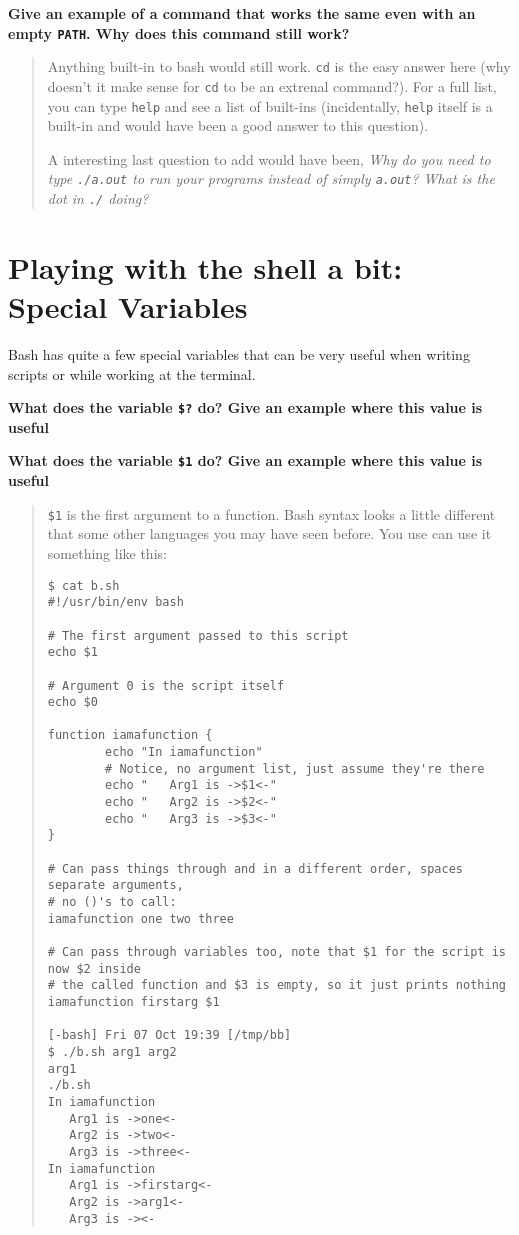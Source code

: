 \documentclass{article}
\begin{document}
\textbf{Give an example of a command that works the same even with an empty
\texttt{PATH}. Why does this command still work?}
\begin{quote}
  \color{violet}
  Anything built-in to bash would still work. \texttt{cd} is the easy answer
  here (why doesn't it make sense for \texttt{cd} to be an extrenal command?).
  For a full list, you can type \texttt{help} and see a list of built-ins
  (incidentally, \texttt{help} itself is a built-in and would have been a
  good answer to this question).

  A interesting last question to add would have been, \emph{Why do you need to
    type \texttt{./a.out} to run your programs instead of simply
  \texttt{a.out}? What is the dot in \texttt{./} doing?}
\end{quote}


\section{Playing with the shell a bit: Special Variables}

Bash has quite a few special variables that can be very useful when writing
scripts or while working at the terminal.

\textbf{What does the variable \texttt{\$?} do? Give an example where this
value is useful}
\vspace{2cm}

\textbf{What does the variable \texttt{\$1} do? Give an example where this
value is useful}
\begin{quote}
  \color{violet}
  \texttt{\$1} is the first argument to a function. Bash syntax looks a little
  different that some other languages you may have seen before. You use can
  use it something like this:

  \begin{lstlisting}
$ cat b.sh
#!/usr/bin/env bash

# The first argument passed to this script
echo $1

# Argument 0 is the script itself
echo $0

function iamafunction {
       	echo "In iamafunction"
       	# Notice, no argument list, just assume they're there
       	echo "   Arg1 is ->$1<-"
       	echo "   Arg2 is ->$2<-"
       	echo "   Arg3 is ->$3<-"
}

# Can pass things through and in a different order, spaces separate arguments,
# no ()'s to call:
iamafunction one two three

# Can pass through variables too, note that $1 for the script is now $2 inside
# the called function and $3 is empty, so it just prints nothing
iamafunction firstarg $1

[-bash] Fri 07 Oct 19:39 [/tmp/bb]
$ ./b.sh arg1 arg2
arg1
./b.sh
In iamafunction
   Arg1 is ->one<-
   Arg2 is ->two<-
   Arg3 is ->three<-
In iamafunction
   Arg1 is ->firstarg<-
   Arg2 is ->arg1<-
   Arg3 is -><-
  \end{lstlisting}
\end{quote}
\end{document}
